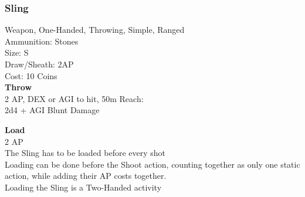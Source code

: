 \subsubsection{Sling}\label{weapon:sling}
Weapon, One-Handed, Throwing, Simple, Ranged\\
Ammunition: Stones\\
Size: S\\
Draw/Sheath: 2AP\\
Cost: 10 Coins\\

\textbf{Throw}\\
2 AP, DEX or AGI to hit, 50m Reach:\\
2d4 + \texttimes AGI Blunt Damage

\textbf{Load}\\
2 AP\\
The Sling has to be loaded before every shot\\
Loading can be done before the Shoot action, counting together as only one static action, while adding their AP costs together.\\
Loading the Sling is a Two-Handed activity
